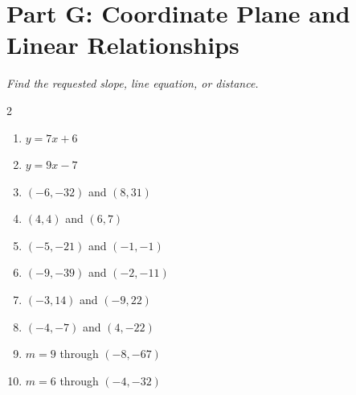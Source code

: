 \documentclass[11pt]{article}
\begin{document}
\section*{Part G: Coordinate Plane and Linear Relationships}
\noindent\textit{Find the requested slope, line equation, or distance.}
\begin{multicols}{2}
\begin{enumerate}
  \item $y = 7x + 6$
  \vspace{1.7cm}
  \item $y = 9x - 7$
  \vspace{1.7cm}
  \item $(-6, -32)$ and $(8, 31)$
  \vspace{1.7cm}
  \item $(4, 4)$ and $(6, 7)$
  \vspace{1.7cm}
  \item $(-5, -21)$ and $(-1, -1)$
  \vspace{1.7cm}
  \item $(-9, -39)$ and $(-2, -11)$
  \vspace{1.7cm}
  \item $(-3, 14)$ and $(-9, 22)$
  \vspace{1.7cm}
  \item $(-4, -7)$ and $(4, -22)$
  \vspace{1.7cm}
  \item $m = 9$ through $(-8, -67)$
  \vspace{1.7cm}
  \item $m = 6$ through $(-4, -32)$
  \vspace{1.7cm}
\end{enumerate}
\end{multicols}
\end{document}
